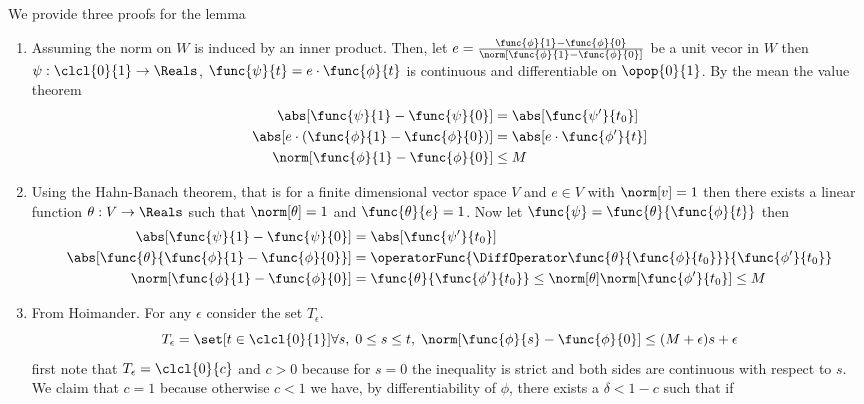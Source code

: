 \begin{prooflemma}
    We provide three proofs for the lemma
    \begin{enumerate}
        \item Assuming the norm on \(W\) is induced by an inner product. Then, let \( e = \frac{\func{\phi}{1} - \func{\phi}{0}}{\norm[\func{\phi}{1} - \func{\phi}{0}]}\) be a unit vecor in \(W\) then \(\psi : \clcl{0}{1} \to \Reals\), \(\func{\psi}{t} = e \cdot \func{\phi}{t}\) is continuous and differentiable on \(\opop{0}{1}\). By the mean the value theorem
              \begin{align*}
                  \abs[\func{\psi}{1} - \func{\psi}{0}]                        & = \abs[\func{\psi'}{t_0}]       \\
                  \abs[e \cdot \left( \func{\phi}{1} - \func{\phi}{0} \right)] & = \abs[e \cdot \func{\phi'}{t}] \\
                  \norm[\func{\phi}{1} - \func{\phi}{0}]                       & \leq M
              \end{align*}
        \item Using the Hahn-Banach theorem, that is for a finite dimensional vector space \(V\) and \(e \in V\) with \(\norm[v] = 1\) then there exists a linear function \(\theta : V \to \Reals\) such that \(\norm[\theta] = 1\) and \(\func{\theta}{e} = 1\). Now let \(\func{\psi} = \func{\theta}{\func{\phi}{t}}\) then
              \begin{align*}
                  \abs[\func{\psi}{1} - \func{\psi}{0}]                & = \abs[\func{\psi'}{t_0}]                                                             \\
                  \abs[\func{\theta}{\func{\phi}{1} - \func{\phi}{0}}] & = \operatorFunc{\DiffOperator \func{\theta}{\func{\phi}{t_0}}}{\func{\phi'}{t_0}}     \\
                  \norm[\func{\phi}{1} - \func{\phi}{0}]               & = \func{\theta}{\func{\phi'}{t_0}} \leq \norm[\theta] \norm[\func{\phi'}{t_0}] \leq M
              \end{align*}
        \item From Hoimander. For any \(\epsilon\) consider the set \(T_\epsilon\).
              \begin{equation*}
                  T_\epsilon = \set[t \in \clcl{0}{1}]{\forall s, \; 0 \leq s \leq t, \; \norm[\func{\phi}{s} - \func{\phi}{0}] \leq(M + \epsilon)s + \epsilon}
              \end{equation*}
              first note that \(T_\epsilon = \clcl{0}{c}\) and \(c > 0\) because for \(s = 0\) the inequality is strict and both sides are continuous with respect to \(s\). We claim that \(c = 1\) because otherwise \(c < 1\) we have, by differentiability of \(\phi\), there exists a \(\delta < 1 - c\) such that if

\end{enumerate}
\end{prooflemma}
